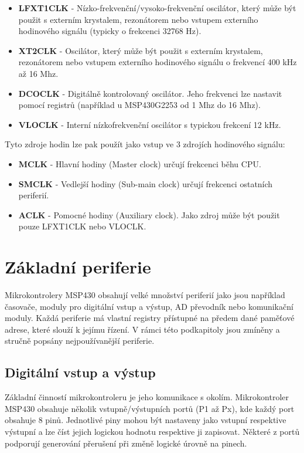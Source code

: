 \begin{itemize}
\item \textbf{LFXT1CLK} - Nízko-frekvenční/vysoko-frekvenční oscilátor, který může být použit s externím krystalem, rezonátorem nebo vstupem externího hodinového signálu (typicky o frekcenci 32768 Hz).
\item \textbf{XT2CLK} - Oscilátor, který může být použit s externím krystalem, rezonátorem nebo vstupem externího hodinového signálu o frekvencí 400 kHz až 16 Mhz.
\item \textbf{DCOCLK} - Digitálně kontrolovaný oscilátor. Jeho frekvenci lze nastavit pomocí registrů (například u MSP430G2253 od 1 Mhz do 16 Mhz).
\item \textbf{VLOCLK} - Interní nízkofrekvenční oscilátor s typickou frekcení 12 kHz.
\end{itemize}

Tyto zdroje hodin lze pak použít jako vstup ve 3 zdrojích hodinového signálu:

\begin{itemize}
\item \textbf{MCLK} - Hlavní hodiny (Master clock) určují frekcenci běhu CPU.
\item \textbf{SMCLK} - Vedlejší hodiny (Sub-main clock) určují frekcenci ostatních periferií.
\item \textbf{ACLK} - Pomocné hodiny (Auxiliary clock). Jako zdroj může být použit pouze LFXT1CLK nebo VLOCLK.
\end{itemize}

\section{Základní periferie}

Mikrokontrolery MSP430 obsahují velké množství periferií jako jsou například časovače, moduly pro digitální vstup a výstup, AD převodník nebo komunikační moduly. Každá periferie má vlastní registry přístupné na předem dané paměťové adrese, které slouží k jejímu řízení. V rámci této podkapitoly jsou zmíněny a stručně popsány nejpoužívanější periferie.

\subsection{Digitální vstup a výstup}

Základní činností mikrokontroleru je jeho komunikace s okolím. Mikrokontroler MSP430 obsahuje několik vstupně/výstupních portů (P1 až Px), kde každý port obsahuje 8 pinů. Jednotlivé piny mohou být nastaveny jako vstupní respektive výstupní a lze číst jejich logickou hodnotu respektive ji zapisovat. Některé z portů podporují generování přerušení při změně logické úrovně na pinech.

